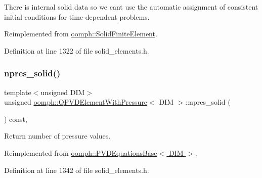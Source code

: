 There is internal solid data so we can\textquotesingle{}t use the automatic assignment of consistent initial conditions for time-\/dependent problems. 



Reimplemented from \hyperlink{classoomph_1_1SolidFiniteElement_aa68837a8f6d1cb021d5cae9c2968a6f3}{oomph\+::\+Solid\+Finite\+Element}.



Definition at line 1322 of file solid\+\_\+elements.\+h.

\mbox{\label{classoomph_1_1QPVDElementWithPressure_a3be2b5458ab056e38eadb28d27995397}} 
\subsubsection{\texorpdfstring{npres\+\_\+solid()}{npres\_solid()}}
{\footnotesize\ttfamily template$<$unsigned D\+IM$>$ \\
unsigned \hyperlink{classoomph_1_1QPVDElementWithPressure}{oomph\+::\+Q\+P\+V\+D\+Element\+With\+Pressure}$<$ D\+IM $>$\+::npres\+\_\+solid (\begin{DoxyParamCaption}{ }\end{DoxyParamCaption}) const\hspace{0.3cm}{\ttfamily [inline]}, {\ttfamily [virtual]}}



Return number of pressure values. 



Reimplemented from \hyperlink{classoomph_1_1PVDEquationsBase_a6e8457327151e87d2fa5694148afc7cc}{oomph\+::\+P\+V\+D\+Equations\+Base$<$ D\+I\+M $>$}.



Definition at line 1342 of file solid\+\_\+elements.\+h.

\mbox{\label{classoomph_1_1QPVDElementWithPressure_a442248cc27256d32e674ab2ffc1aa032}} 
